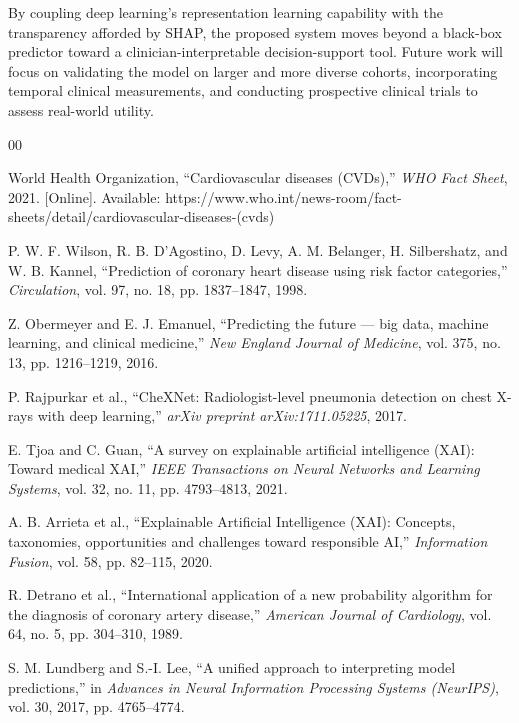\documentclass[conference]{IEEEtran}
\begin{document}
By coupling deep learning's representation learning capability with the transparency afforded by SHAP, the proposed system moves beyond a black-box predictor toward a clinician-interpretable decision-support tool. Future work will focus on validating the model on larger and more diverse cohorts, incorporating temporal clinical measurements, and conducting prospective clinical trials to assess real-world utility.

\begin{thebibliography}{00}

World Health Organization, ``Cardiovascular diseases (CVDs),'' \textit{WHO Fact Sheet}, 2021. [Online]. Available: https://www.who.int/news-room/fact-sheets/detail/cardiovascular-diseases-(cvds)

P. W. F. Wilson, R. B. D'Agostino, D. Levy, A. M. Belanger, H. Silbershatz, and W. B. Kannel, ``Prediction of coronary heart disease using risk factor categories,'' \textit{Circulation}, vol. 97, no. 18, pp. 1837--1847, 1998.

Z. Obermeyer and E. J. Emanuel, ``Predicting the future — big data, machine learning, and clinical medicine,'' \textit{New England Journal of Medicine}, vol. 375, no. 13, pp. 1216--1219, 2016.

P. Rajpurkar et al., ``CheXNet: Radiologist-level pneumonia detection on chest X-rays with deep learning,'' \textit{arXiv preprint arXiv:1711.05225}, 2017.

E. Tjoa and C. Guan, ``A survey on explainable artificial intelligence (XAI): Toward medical XAI,'' \textit{IEEE Transactions on Neural Networks and Learning Systems}, vol. 32, no. 11, pp. 4793--4813, 2021.

A. B. Arrieta et al., ``Explainable Artificial Intelligence (XAI): Concepts, taxonomies, opportunities and challenges toward responsible AI,'' \textit{Information Fusion}, vol. 58, pp. 82--115, 2020.

R. Detrano et al., ``International application of a new probability algorithm for the diagnosis of coronary artery disease,'' \textit{American Journal of Cardiology}, vol. 64, no. 5, pp. 304--310, 1989.

S. M. Lundberg and S.-I. Lee, ``A unified approach to interpreting model predictions,'' in \textit{Advances in Neural Information Processing Systems (NeurIPS)}, vol. 30, 2017, pp. 4765--4774.


\end{thebibliography}
\end{document}

